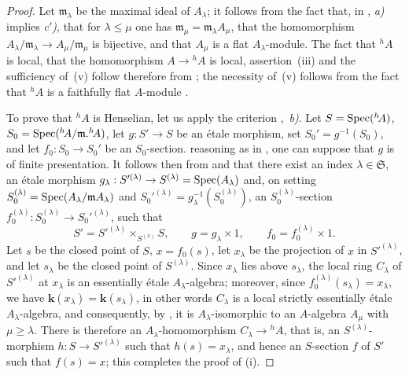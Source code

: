 \begin{proof}
Let $\mathfrak{m}_\lambda$ be the maximal ideal of $A_\lambda$;
it follows from the fact that, in , \emph{a)} implies \emph{c$'$)}, that for $\lambda\leq\mu$ one has $\mathfrak{m}_\mu=\mathfrak{m}_\lambda A_\mu$, that the homomorphism $A_\lambda/\mathfrak{m}_\lambda\to A_\mu/\mathfrak{m}_\mu$ is bijective, and that $A_\mu$ is a flat $A_\lambda$-module.
The fact that ${}^h\!A$ is local, that the homomorphism $A\to{}^h\!A$ is local, assertion~(iii) and the sufficiency of~(v) follow therefore from ;
the necessity of~(v) follows from the fact that ${}^h\!A$ is a faithfully flat $A$-module .

To prove that ${}^h\!A$ is Henselian, let us apply the criterion ,~\emph{b)}.
Let $S=\operatorname{Spec}({}^h\!A)$, $S_0=\operatorname{Spec}({}^h\!A/\mathfrak{m}.{}^h\!A)$, let $g:S'\to S$ be an \'{e}tale morphism, set $S_0'=g^{-1}(S_0)$, and let $f_0:S_0\to S_0'$ be an $S_0$-section.
reasoning as in , one can suppose that $g$ is of finite presentation.
It follows then from  and  that there exist an index $\lambda\in\mathfrak{S}$, an \'etale morphism $g_\lambda:S'^{(\lambda)}\to S^{(\lambda)}=\operatorname{Spec}(A_\lambda)$ and, on setting $S_0^{(\lambda)}=\operatorname{Spec}(A_\lambda/\mathfrak{m}A_\lambda)$ and $S_0'^{(\lambda)}=g_\lambda^{-1}(S_0^{(\lambda)})$, an $S_0^{(\lambda)}$-section $f_0^{(\lambda)}:S_0^{(\lambda)}\to S_0'^{(\lambda)}$, such that
\[
S'=S'^{(\lambda)}\times_{S^{(\lambda)}}S,\qquad
g=g_\lambda\times 1,\qquad
f_0=f_0^{(\lambda)}\times 1.
\]
Let $s$ be the closed point of $S$, $x=f_0(s)$, let $x_\lambda$ be the projection of $x$ in $S'^{(\lambda)}$, and let $s_\lambda$ be the closed point of $S^{(\lambda)}$.
Since $x_\lambda$ lies above $s_\lambda$, the local ring $C_\lambda$ of $S'^{(\lambda)}$ at $x_\lambda$ is an essentially \'etale $A_\lambda$-algebra;
moreover, since $f_0^{(\lambda)}(s_\lambda)=x_\lambda$, we have $\boldsymbol{k}(x_\lambda)=\boldsymbol{k}(s_\lambda)$, in other words $C_\lambda$ is a local strictly essentially \'etale $A_\lambda$-algebra, and consequently, by , it is $A_\lambda$-isomorphic to an $A$-algebra $A_\mu$ with $\mu\geq\lambda$.
There is therefore an $A_\lambda$-homomorphism $C_\lambda\to{}^h\!A$, that is, an $S^{(\lambda)}$-morphism $h:S\to S'^{(\lambda)}$ such that $h(s)=x_\lambda$, and hence an $S$-section $f$ of $S'$ such that $f(s)=x$;
this completes the proof of (i).


\end{proof}
